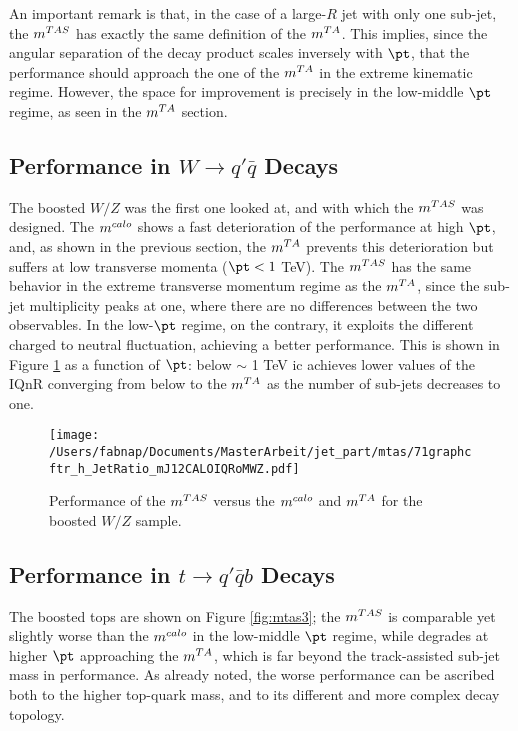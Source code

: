 An important remark is that, in the case of a large-$R$ jet with only one sub-jet, the $\mtas$ has exactly the same definition of the $m^{TA}$. This implies, since the angular separation of the decay product scales inversely with $\pt$, that the performance should approach the one of the $m^{TA}$ in the extreme kinematic regime. However, the space for improvement is precisely in the low-middle $\pt$ regime, as seen in the $m^{TA}$ section.

\subsection{Performance in $W \to q'\bar{q}$ Decays}
The boosted $W/Z$ was the first one looked at, and with which the $\mtas$ was designed. The $m^{calo}$ shows a fast deterioration of the performance at high $\pt$, and, as shown in the previous section, the $m^{TA}$ prevents this deterioration but suffers at low transverse momenta ($\pt<1$ TeV).
The $\mtas$ has the same behavior in the extreme transverse momentum regime as the $m^{TA}$, since the sub-jet multiplicity peaks at one, where there are no differences between the two observables.
In the low-$\pt$ regime, on the contrary, it exploits the different charged to neutral fluctuation, achieving a better performance.
This is shown in Figure \ref{fig:mtas2} as a function of $\pt$: below $\sim$ 1 TeV ic achieves lower values of the IQnR converging from below to the $m^{TA}$ as the number of sub-jets decreases to one.

\begin{figure}[!ht]
  \centering
      \texttt{[image: /Users/fabnap/Documents/MasterArbeit/jet\_part/mtas/71graphcftr\_h\_JetRatio\_mJ12CALOIQRoMWZ.pdf]}
  \caption[$\mtas$ for boosted $W/Z$]{Performance of the $\mtas$ versus the $m^{calo}$ and $m^{TA}$ for the boosted $W/Z$ sample.}
  \label{fig:mtas2}
\end{figure}

\subsection{Performance in $t\to q'\bar{q}b$ Decays}
The boosted tops are shown on Figure \ref{fig:mtas3}; the $\mtas$ is comparable yet slightly worse than the $m^{calo}$ in the low-middle $\pt$ regime, while degrades at higher $\pt$ approaching the $m^{TA}$, which is far beyond the track-assisted sub-jet mass in performance.
As already noted, the worse performance can be ascribed both to the higher top-quark mass, and to its different and more complex decay topology.


